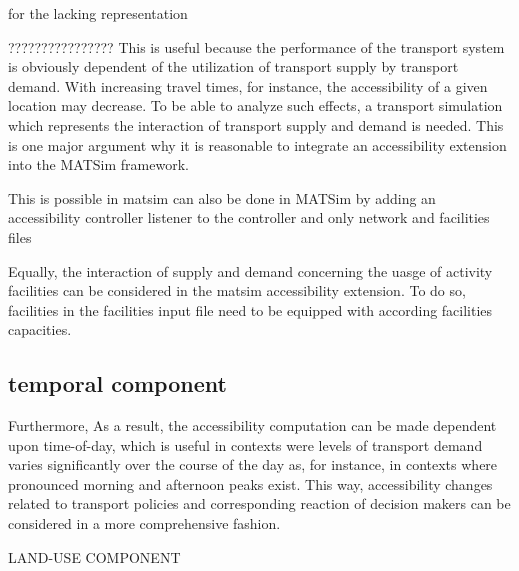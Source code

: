  for the lacking representation 


????????????????
This is useful because the performance of the transport system is obviously dependent of the utilization of transport supply by transport demand. With increasing travel times, for instance, the accessibility of a given location may decrease. To be able to analyze such effects, a transport simulation which represents the interaction of transport supply and demand is needed. This is one major argument why it is reasonable to integrate an accessibility extension into the MATSim framework.

This is possible in \gls{matsim} can also be done in MATSim by adding an accessibility controller listener to the controller and only network and facilities files

Equally, the interaction of supply and demand concerning the uasge of activity facilities can be considered in the \gls{matsim} accessibility extension. To do so, facilities in the facilities input file need to be equipped with according facilities capacities.

\subsection{temporal component}


Furthermore,
As a result, the accessibility computation can be made dependent upon time-of-day, which is useful in contexts were levels of transport demand varies significantly over the course of the day as, for instance, in contexts where pronounced morning and afternoon peaks exist. This way, accessibility changes related to transport policies and corresponding reaction of decision makers can be considered in a more comprehensive fashion.


LAND-USE COMPONENT

